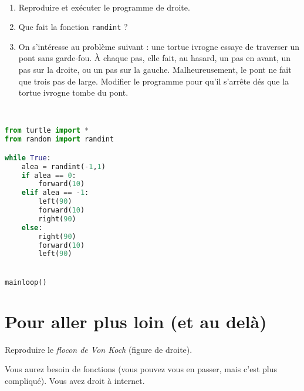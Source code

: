 \documentclass[12pt]{article}
\begin{document}
\begin{multicols}{2}

  ~

  \begin{enumerate}
    \item Reproduire et exécuter le programme de droite.
    \item Que fait la fonction \texttt{randint} ?
    \item On s'intéresse au problème suivant : une tortue ivrogne essaye de traverser un pont sans garde-fou. À chaque pas, elle fait, au hasard, un pas en avant, un pas sur la droite, ou un pas sur la gauche. Malheureusement, le pont ne fait que trois pas de large. Modifier le programme pour qu'il s'arrête dés que la tortue ivrogne tombe du pont.
  \end{enumerate}

  ~

  \columnbreak

\begin{lstlisting}[language=python,frame=single]
from turtle import *
from random import randint

while True:
    alea = randint(-1,1)
    if alea == 0:
        forward(10)
    elif alea == -1:
        left(90)
        forward(10)
        right(90)
    else:
        right(90)
        forward(10)
        left(90)


mainloop()
\end{lstlisting}
\end{multicols}

\section{Pour aller plus loin (et au delà)}

\begin{multicols}{2}
  \noindent Reproduire le \emph{flocon de Von Koch} (figure de droite).

  \noindent Vous aurez besoin de fonctions (vous pouvez vous en passer, mais c'est plus compliqué). Vous avez droit à internet.

\end{multicols}
\end{document}
